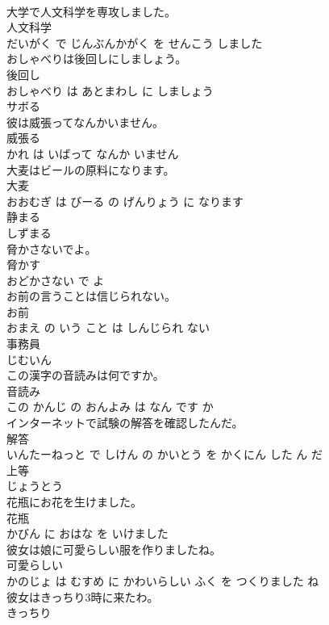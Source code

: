 \documentclass[8pt]{extreport}
\begin{document}
\begin{CJK}{UTF8}{min}
\\	大学で人文科学を専攻しました。	
\\	人文科学 
\\	だいがく で じんぶんかがく を せんこう しました			
\\	おしゃべりは後回しにしましょう。	
\\	後回し 
\\	おしゃべり は あとまわし に しましょう			
\\	サボる	
\\	彼は威張ってなんかいません。	
\\	威張る 
\\	かれ は いばって なんか いません			
\\	大麦はビールの原料になります。	
\\	大麦 
\\	おおむぎ は びーる の げんりょう に なります			
\\	静まる	
\\	しずまる		
\\	脅かさないでよ。	
\\	脅かす 
\\	おどかさない で よ			
\\	お前の言うことは信じられない。	
\\	お前 
\\	おまえ の いう こと は しんじられ ない			
\\	事務員	
\\	じむいん		
\\	この漢字の音読みは何ですか。	
\\	音読み 
\\	この かんじ の おんよみ は なん です か			
\\	インターネットで試験の解答を確認したんだ。	
\\	解答 
\\	いんたーねっと で しけん の かいとう を かくにん した ん だ			
\\	上等	
\\	じょうとう		
\\	花瓶にお花を生けました。	
\\	花瓶 
\\	かびん に おはな を いけました			
\\	彼女は娘に可愛らしい服を作りましたね。	
\\	可愛らしい 
\\	かのじょ は むすめ に かわいらしい ふく を つくりました ね			
\\	彼女はきっちり3時に来たわ。	
\\	きっちり 

\end{CJK}
\end{document}
